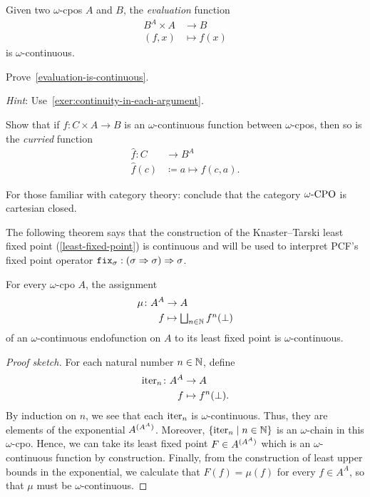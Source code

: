 \begin{lemma}\label{evaluation-is-continuous}
  Given two \(\omega\)-cpos \(A\) and \(B\), the \emph{evaluation} function
  \begin{align*}
    B^A \times A &\to B \\
    (f,x) &\mapsto f(x)
  \end{align*}
  is \(\omega\)-continuous.
\end{lemma}
\begin{exercise}\label{exer:evaluation-is-continuous}
  Prove~\cref{evaluation-is-continuous}.

  \emph{Hint}: Use~\cref{exer:continuity-in-each-argument}.
\end{exercise}

\begin{exercise}\label{exer:curry-is-continuous}
  Show that if \(f \colon C \times A \to B\) is an \(\omega\)-continuous
  function between \(\omega\)-cpos, then so is the \emph{curried} function
  \begin{align*}
    \hat{f} \colon C &\to B^A \\
    \hat{f}(c) &\coloneqq a \mapsto f(c,a).
  \end{align*}

  For those familiar with category theory: conclude that the category
  \(\omegaCPO\) is cartesian closed.
\end{exercise}

The following theorem says that the construction of the Knaster--Tarski least
fixed point (\cref{least-fixed-point}) is continuous and will be used to
interpret PCF's fixed point operator
\(\pcffix_\sigma : \pa*{\sigma \pcffun \sigma} \pcffun \sigma\).
\begin{theorem}\label{least-fixed-point-is-continuous}
  For every \(\omega\)-cpo \(A\), the assignment
  \begin{align*}
    \mu \colon A^A &\to A \\
    f &\mapsto \textstyle\bigsqcup_{n \in \Nat}f^n(\bot)
  \end{align*}
  of an \(\omega\)-continuous endofunction on \(A\) to its least fixed point is
  \(\omega\)-continuous.
\end{theorem}
\begin{proof}[Proof sketch]
  For each natural number \(n \in \Nat\), define
  \begin{align*}
    \iter_n \colon A^A &\to A \\
    f &\mapsto f^n(\bot).
  \end{align*}
  By induction on \(n\), we see that each \(\iter_n\) is \(\omega\)-continuous.
  Thus, they are elements of the exponential \(A^{\pa{A^A}}\).
  Moreover, \(\set{\iter_n \mid n \in \Nat}\) is an \(\omega\)-chain in this
  \(\omega\)-cpo.
  Hence, we can take its least fixed point \(F \in A^{\pa{A^A}}\) which is an
  \(\omega\)-continuous function by construction.
  Finally, from the construction of least upper bounds in the exponential, we
  calculate that \(F(f) = \mu(f)\) for every \(f \in A^A\), so that \(\mu\)
  must be \(\omega\)-continuous.
\end{proof}

